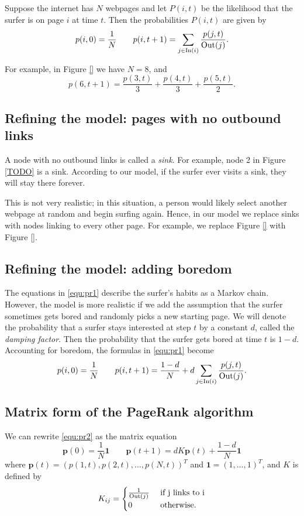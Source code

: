 Suppose the internet has $N$ webpages and let $P(i,t)$ be the likelihood that the surfer is on page $i$ at time $t$.
Then the probabilities $P(i,t)$ are given by
\begin{equation}\label{equ:pr1}
p(i,0)=\frac{1}{N} \qquad p(i,t+1) = \sum_{j \in \operatorname{In}(i)} \frac{p(j,t)}{\operatorname{Out}(j)}.
\end{equation}

For example, in Figure \ref{} we have $N=8$, and 
\[
p(6, t+1)=\frac{p(3,t)}{3}+\frac{p(4,t)}{3} + \frac{p(5,t)}{2}.
\]

\subsection*{Refining the model: pages with no outbound links}
A node with no outbound links is called a \emph{sink}. 
For example, node 2 in Figure \ref{TODO} is a sink.
According to our model, if the surfer ever visits a sink, they will stay there forever.

This is not very realistic; in this situation, a person would likely select another webpage at random and begin surfing again.
Hence, in our model we replace sinks with nodes linking to every other page. 
For example, we replace Figure \ref{} with Figure \ref{}.

\subsection*{Refining the model: adding boredom}
The equations in \eqref{equ:pr1} describe the surfer's habits as a Markov chain.
However, the model is more realistic if we add the assumption that the surfer sometimes gets bored and randomly picks a new starting page.
We will denote the probability that a surfer stays interested at step $t$ by a constant $d$, called the \emph{damping factor}.
Then the probability that the surfer gets bored at time $t$ is $1-d$.
Accounting for boredom, the formulas in \eqref{equ:pr1} become
\begin{equation}\label{equ:pr2}
p(i,0)=\frac{1}{N} \qquad p(i,t+1) = \frac{1-d}{N} + d\sum_{j \in \operatorname{In}(i)} \frac{p(j,t)}{\operatorname{Out}(j)}.
\end{equation}


\subsection*{Matrix form of the PageRank algorithm}
We can rewrite \eqref{equ:pr2} as the matrix equation
\begin{equation}\label{equ:pr3}
\mathbf{p}(0)=\frac{1}{N}\mathbf{1} \qquad \mathbf{p}(t+1) = dK\mathbf{p}(t) + \frac{1-d}{N}\mathbf{1}
\end{equation}
where $\mathbf{p}(t)=(p(1,t), p(2,t), \ldots, p(N,t))^T$ and $\mathbf{1} = (1,\ldots, 1)^T$, and $K$ is defined by
\[K_{ij} = \begin{cases} \frac{1}{\operatorname{Out}(j)} & \mbox{ if j links to i} \\
	0 & \mbox{ otherwise.} \end{cases}\]


